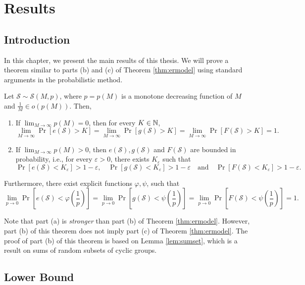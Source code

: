 \chapter{Results}\label{chap:results}


\section{Introduction}  

In this chapter, we present the main results of this thesis. We will prove a theorem similar to parts (b) and (c) of Theorem \ref{thm:ermodel} using standard arguments in the probabilistic method. 

\begin{theorem}\label{thm:main}
    Let $\mathcal{S} \sim \mathcal{S}(M, p)$, where $p = p(M)$ is a monotone decreasing function of $M$ and $\frac{1}{M} \in o(p(M))$. Then, 
\begin{enumerate}[label=(\alph*)]
    \item If $\lim_{M \to \infty} p(M) = 0$, then for every $K \in \mathbb{N}$,   
    \[\lim_{M \to \infty} \Pr[e(\mathcal{S}) > K] = \lim_{M \to \infty} \Pr[g(\mathcal{S}) > K] = \lim_{M \to \infty} \Pr[F(\mathcal{S}) > K] = 1.\]
    \item If $\lim_{M \to \infty} p(M) > 0$, then $e(\mathcal{S}), g(\mathcal{S})$ and $F(\mathcal{S})$ are bounded in probability, i.e., for every $\varepsilon > 0$, there exists $K_\varepsilon$ such that 
    \[ \Pr[e(\mathcal{S}) < K_\varepsilon] > 1 - \varepsilon, \quad  \Pr[g(\mathcal{S}) < K_\varepsilon] > 1- \varepsilon \quad \text{and} \quad \Pr[F(\mathcal{S}) < K_\varepsilon] > 1 - \varepsilon.\]
\end{enumerate}
Furthermore, there exist explicit functions $\varphi, \psi$, such that 
\[\lim_{p \to 0} \Pr\left[e(\mathcal{S}) < \varphi\left(\frac{1}{p}\right)\right] = \lim_{p \to 0} \Pr\left[g(\mathcal{S}) < \psi\left(\frac{1}{p}\right)\right]  = \lim_{p \to 0} \Pr\left[F(\mathcal{S}) < \psi\left(\frac{1}{p}\right)\right] = 1.\]
\end{theorem}
Note that part (a) is \textit{stronger} than part (b) of Theorem \ref{thm:ermodel}. However, part (b) of this theorem does not imply part (c) of Theorem \ref{thm:ermodel}. The proof of part (b) of this theorem is based on Lemma \ref{lem:sumset}, which is a result on sums of random subsets of cyclic groups.  

\section{Lower Bound}\label{sec:results:lowerbound}

